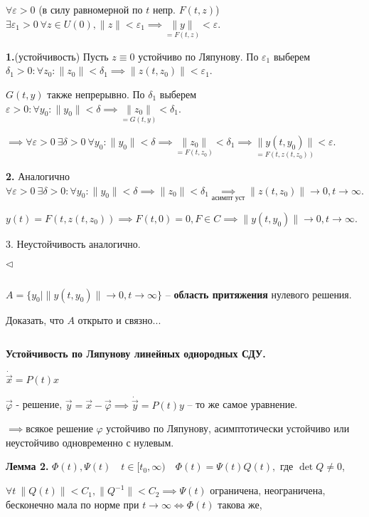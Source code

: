 \documentclass[12pt, a4paper]{article}
\begin{document}
  $\forall \varepsilon >0$ (в силу равномерной по $t$ непр. $F(t,z)$) \ $\exists \varepsilon_1 > 0 \ \forall z \in U(0), \|z\| < \varepsilon_1 \implies \underset{=F(t,z)}{\|y\|} < \varepsilon$.

  \textbf{1.}(устойчивость) Пусть $z\equiv 0$ устойчиво по Ляпунову. По $\varepsilon_1$ выберем $\delta_1 >0 : \forall z_0 : \| z_0\| < \delta_1 \implies \|z(t,z_0)\| < \varepsilon_1$. 

  $G(t,y)$ также непрерывно. По $\delta_1$ выберем $\varepsilon > 0: \forall y_0 :\|y_0\| < \delta \implies \underset{=G(t,y)}{\|z_0\|} < \delta_1 $.

  $\implies \forall \varepsilon > 0 \ \exists \delta > 0 \ \forall y_0: \|y_0\| < \delta \implies \underset{=F(t,z_0)}{\| z_0\|} < \delta_1 \implies \underset{=F(t,z(t,z_0))}{\|y(t,y_0)\|} < \varepsilon$.

  \textbf{2.} Аналогично $\forall \varepsilon>0 \ \exists \delta>0: \forall y_0: \|y_0\| < \delta \implies \|z_0\| < \delta_1 \underset{\text{асимпт уст}}{\implies} \| z(t,z_0) \|\to 0, t\to \infty$.
  
  $y(t) = F(t, z(t,z_0)) \implies F(t,0)=0, F \in C \implies \|y(t, y_0)\| \to 0, t \to \infty$.

  3. Неустойчивость аналогично.

  $\triangleleft$

  \par $ $

  $A = \{ y_0 \mid \| y(t, y_0) \| \to 0, t \to \infty\}$ -- \textbf{область притяжения} нулевого решения.

  Доказать, что $A$ открыто и связно...

  \par $ $

  \textbf{\large Устойчивость по Ляпунову линейных однородных СДУ.}

  $\dot{\vec{x}} = P(t) x$

  $\vec{\varphi}$ - решение, $\vec{y} = \vec{x} - \vec \varphi \implies \dot{\vec y} = P(t) y$ -- то же самое уравнение.

  $\implies \text{всякое решение } \varphi$ устойчиво по Ляпунову, асимптотически устойчиво или неустойчиво одновременно с нулевым.

  \textbf{Лемма 2.} $\Phi(t), \Psi(t) \quad t \in [t_0, \infty)\quad \Phi(t) = \Psi(t)Q(t), $ где $\det Q \neq 0$,

  $\forall t \ \|Q(t) \| < C_1, \| Q^{-1} \| < C_2 \implies \Psi(t)$ ограничена, неограничена, бесконечно мала по норме при $t\to\infty \iff \Phi(t)$ такова же, 
\end{document}
